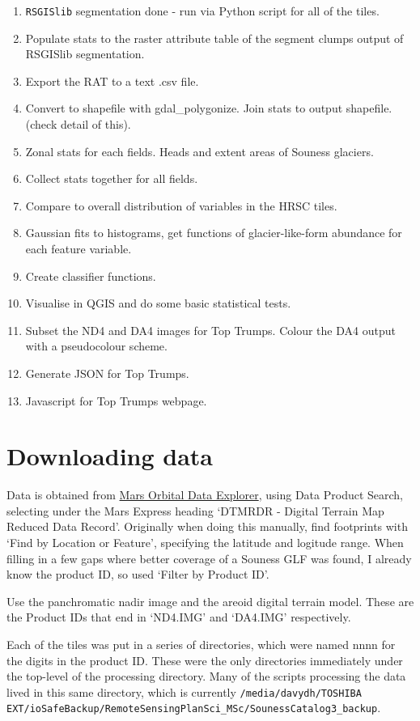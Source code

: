 \documentclass[a4paper,12pt]{article}
\begin{document}
\begin{enumerate}
 \item {\tt RSGISlib} segmentation done - run via Python script for all of the tiles. 
 \item Populate stats to the raster attribute table of the segment clumps output of RSGISlib segmentation.
 \item Export the RAT to a text .csv file. 
 \item Convert to shapefile with gdal\_polygonize. Join stats to output shapefile. (check detail of this). 
 \item Zonal stats for each fields. Heads and extent areas of Souness glaciers.
 \item Collect stats together for all fields.
 \item Compare to overall distribution of variables in the HRSC tiles.
 \item Gaussian fits to histograms, get functions of glacier-like-form abundance for each feature variable.
 \item Create classifier functions.
 \item Visualise in QGIS and do some basic statistical tests.
 \item Subset the ND4 and DA4 images for Top Trumps. Colour the DA4 output with a pseudocolour scheme.
 \item Generate JSON for Top Trumps.
 \item Javascript for Top Trumps webpage.
\end{enumerate}

\section{Downloading data}
Data is obtained from \href{http://ode.rsl.wustl.edu/mars/}{Mars Orbital Data Explorer}, using Data Product Search, selecting under the Mars Express heading `DTMRDR - Digital Terrain Map Reduced Data Record'. Originally when doing this manually, find footprints with `Find by Location or Feature', specifying the latitude and logitude range. When filling in a few gaps where better coverage of a Souness GLF was found, I already know the product ID, so used `Filter by Product ID'.

Use the panchromatic nadir image and the areoid digital terrain model. These are the Product IDs that end in `ND4.IMG' and `DA4.IMG' respectively.

Each of the tiles was put in a series of directories, which were named nnnn for the digits in the product ID. These were the only directories immediately under the top-level of the processing directory. Many of the scripts processing the data lived in this same directory, which is currently {\tt /media/davydh/TOSHIBA EXT/ioSafeBackup/RemoteSensingPlanSci\_MSc/SounessCatalog3\_backup}. 
\end{document}

